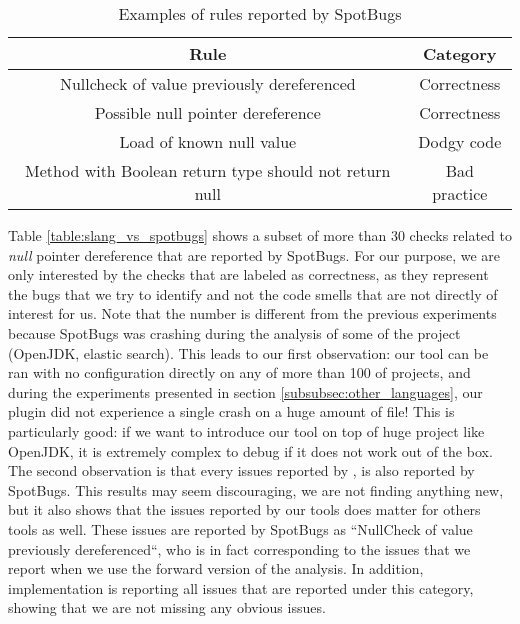 \begin{table}[h]
	\centering
	\caption{Examples of rules reported by SpotBugs}
	\label{table:spotbugs-rules}
	\begin{tabular}{|c|c|}
		\hline
		\bf Rule & \bf Category\\ \hline
		Nullcheck of value previously dereferenced & Correctness  \\
		Possible null pointer dereference & Correctness  \\
		Load of known null value & Dodgy code \\
		Method with Boolean return type should not return null & Bad practice \\ \hline
	\end{tabular}
\end{table}

Table \ref{table:slang_vs_spotbugs} shows a subset of more than 30 checks related to \emph{null} pointer dereference that are reported by SpotBugs. 
For our purpose, we are only interested by the checks that are labeled as correctness, as they represent the bugs that we try to identify and not the code smells that are not directly of interest for us. \newline
Note that the number is different from the previous experiments because SpotBugs was crashing during the analysis of some of the project (OpenJDK, elastic search). 
This leads to our first observation: our tool can be ran with no configuration directly on any of more than 100 of projects, and during the experiments presented in section \ref{subsubsec:other_languages}, our plugin did not experience a single crash on a huge amount of file!
This is particularly good: if we want to introduce our tool on top of huge project like OpenJDK, it is extremely complex to debug if it does not work out of the box.
The second observation is that every issues reported by \slang{}, is also reported by SpotBugs. 
This results may seem discouraging, we are not finding anything new, but it also shows that the issues reported by our tools does matter for others tools as well. 
These issues are reported by SpotBugs as “NullCheck of value previously dereferenced“, who is in fact corresponding to the issues that we report when we use the forward version of the analysis. 
In addition, \slang{} implementation is reporting all issues that are reported under this category, showing that we are not missing any obvious issues. \newline

